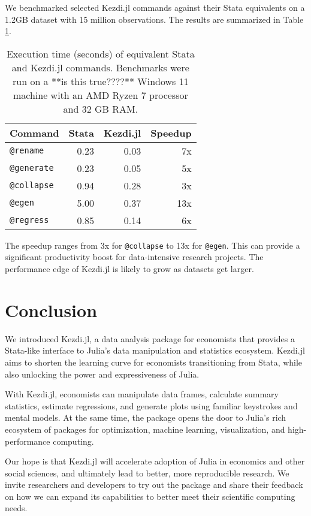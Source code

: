 \documentclass{juliacon}
\begin{document}
We benchmarked selected Kezdi.jl commands against their Stata equivalents on a 1.2GB dataset with 15 million observations. The results are summarized in Table \ref{tab:benchmark}.

\begin{table}[ht]
	\centering
	\begin{tabular}{lrrr}
		\hline
		Command            & Stata & Kezdi.jl & Speedup \\
		\hline
		\texttt{@rename}   & 0.23  & 0.03     & 7x      \\
		\texttt{@generate} & 0.23  & 0.05     & 5x      \\
		\texttt{@collapse} & 0.94  & 0.28     & 3x      \\
		\texttt{@egen}     & 5.00  & 0.37     & 13x     \\
		\texttt{@regress}  & 0.85  & 0.14     & 6x      \\
		\hline
	\end{tabular}
	\caption{Execution time (seconds) of equivalent Stata and Kezdi.jl commands. Benchmarks were run on a **is this true????** Windows 11 machine with an AMD Ryzen 7 processor and 32 GB RAM.}
	\label{tab:benchmark}
\end{table}

The speedup ranges from 3x for \texttt{@collapse} to 13x for \texttt{@egen}. This can provide a significant productivity boost for data-intensive research projects. The performance edge of Kezdi.jl is likely to grow as datasets get larger.

\section{Conclusion}

We introduced Kezdi.jl, a data analysis package for economists that provides a Stata-like interface to Julia's data manipulation and statistics ecosystem. Kezdi.jl aims to shorten the learning curve for economists transitioning from Stata, while also unlocking the power and expressiveness of Julia.

With Kezdi.jl, economists can manipulate data frames, calculate summary statistics, estimate regressions, and generate plots using familiar keystrokes and mental models. At the same time, the package opens the door to Julia's rich ecosystem of packages for optimization, machine learning, visualization, and high-performance computing.

Our hope is that Kezdi.jl will accelerate adoption of Julia in economics and other social sciences, and ultimately lead to better, more reproducible research. We invite researchers and developers to try out the package and share their feedback on how we can expand its capabilities to better meet their scientific computing needs.
\end{document}
